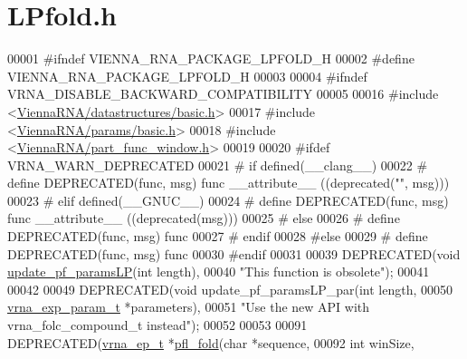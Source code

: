 \hypertarget{LPfold_8h_source}{}\section{L\+Pfold.\+h}
\label{LPfold_8h_source}

\begin{DoxyCode}
00001 \textcolor{preprocessor}{#ifndef VIENNA\_RNA\_PACKAGE\_LPFOLD\_H}
00002 \textcolor{preprocessor}{#define VIENNA\_RNA\_PACKAGE\_LPFOLD\_H}
00003 
00004 \textcolor{preprocessor}{#ifndef VRNA\_DISABLE\_BACKWARD\_COMPATIBILITY}
00005 
00016 \textcolor{preprocessor}{#include <\hyperlink{datastructures_2basic_8h}{ViennaRNA/datastructures/basic.h}>}
00017 \textcolor{preprocessor}{#include <\hyperlink{params_2basic_8h}{ViennaRNA/params/basic.h}>}
00018 \textcolor{preprocessor}{#include <\hyperlink{part__func__window_8h}{ViennaRNA/part\_func\_window.h}>}
00019 
00020 \textcolor{preprocessor}{#ifdef VRNA\_WARN\_DEPRECATED}
00021 \textcolor{preprocessor}{# if defined(\_\_clang\_\_)}
00022 \textcolor{preprocessor}{#  define DEPRECATED(func, msg) func \_\_attribute\_\_ ((deprecated("", msg)))}
00023 \textcolor{preprocessor}{# elif defined(\_\_GNUC\_\_)}
00024 \textcolor{preprocessor}{#  define DEPRECATED(func, msg) func \_\_attribute\_\_ ((deprecated(msg)))}
00025 \textcolor{preprocessor}{# else}
00026 \textcolor{preprocessor}{#  define DEPRECATED(func, msg) func}
00027 \textcolor{preprocessor}{# endif}
00028 \textcolor{preprocessor}{#else}
00029 \textcolor{preprocessor}{# define DEPRECATED(func, msg) func}
00030 \textcolor{preprocessor}{#endif}
00031 
00039 DEPRECATED(\textcolor{keywordtype}{void} \hyperlink{group__part__func__window__deprecated_ga5a019014d37fe6105131dfc2fc447880}{update\_pf\_paramsLP}(\textcolor{keywordtype}{int} length),
00040 \textcolor{stringliteral}{"This function is obsolete"});
00041 
00042 
00049 DEPRECATED(\textcolor{keywordtype}{void} update\_pf\_paramsLP\_par(\textcolor{keywordtype}{int}              length,
00050                                        \hyperlink{group__energy__parameters_structvrna__exp__param__s}{vrna\_exp\_param\_t} *parameters),
00051 \textcolor{stringliteral}{"Use the new API with vrna\_folc\_compound\_t instead"});
00052 
00053 
00091 DEPRECATED(\hyperlink{group__struct__utils__plist_structvrna__elem__prob__s}{vrna\_ep\_t} *\hyperlink{group__part__func__window__deprecated_ga7cdf690583871f9c158a0f91d4785cb6}{pfl\_fold}(\textcolor{keywordtype}{char}          *sequence,
00092                                \textcolor{keywordtype}{int}           winSize,

\end{DoxyCode}
